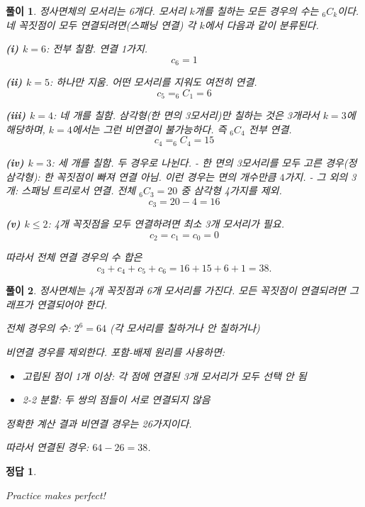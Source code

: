 \documentclass[12pt,a4paper]{article}
\theoremstyle{test_form}
\newtheorem*{solution}{풀이}
\newtheorem*{answer}{정답}
\begin{document}
\begin{solution}
    \setlength{\parindent}{0pt}
    
    정사면체의 모서리는 6개다. 모서리 \(k\)개를 칠하는 모든 경우의 수는 \(_6C_k\)이다.  
    네 꼭짓점이 모두 연결되려면(스패닝 연결) 각 \(k\)에서 다음과 같이 분류된다.
    
    \textbf{(i) \(k=6\)}: 전부 칠함. 연결 1가지.  
    \[
    c_6=1
    \]
    
    \textbf{(ii) \(k=5\)}: 하나만 지움. 어떤 모서리를 지워도 여전히 연결.
    \[
    c_5=_6C_1=6
    \]
    
    \textbf{(iii) \(k=4\)}: 네 개를 칠함. 삼각형(한 면의 3모서리)만 칠하는 것은 3개라서 \(k=3\)에 해당하며, \(k=4\)에서는 그런 비연결이 불가능하다.
    즉 \(_6C_4\) 전부 연결.
    \[
    c_4=_6C_4=15
    \]
    
    \textbf{(iv) \(k=3\)}: 세 개를 칠함. 두 경우로 나뉜다.
    - 한 면의 3모서리를 모두 고른 경우(정삼각형): 한 꼭짓점이 빠져 \emph{연결 아님}. 이런 경우는 면의 개수만큼 \(4\)가지.
    - 그 외의 3개: 스패닝 트리로서 \emph{연결}. 전체 \(_6C_3=20\) 중 삼각형 4가지를 제외.
    \[
    c_3=20-4=16
    \]
    
    \textbf{(v) \(k\le 2\)}: 4개 꼭짓점을 모두 연결하려면 최소 3개 모서리가 필요.  
    \[
    c_2=c_1=c_0=0
    \]
    
    따라서 전체 연결 경우의 수 합은
    \[
    c_3+c_4+c_5+c_6=16+15+6+1=38.
    \]
    \end{solution}

    
\begin{solution}
정사면체는 4개 꼭짓점과 6개 모서리를 가진다. 모든 꼭짓점이 연결되려면 그래프가 연결되어야 한다.

전체 경우의 수: \(2^6 = 64\) (각 모서리를 칠하거나 안 칠하거나)

비연결 경우를 제외한다. 포함-배제 원리를 사용하면:
\begin{itemize}
\item 고립된 점이 1개 이상: 각 점에 연결된 3개 모서리가 모두 선택 안 됨
\item 2-2 분할: 두 쌍의 점들이 서로 연결되지 않음
\end{itemize}

정확한 계산 결과 비연결 경우는 26가지이다.

따라서 연결된 경우: \(64 - 26 = 38\).
\end{solution}

\begin{answer}
\hfill {}
\end{answer}

\vspace{1cm}
\begin{center}
    \textit{Practice makes perfect!}
\end{center}
\end{document}
